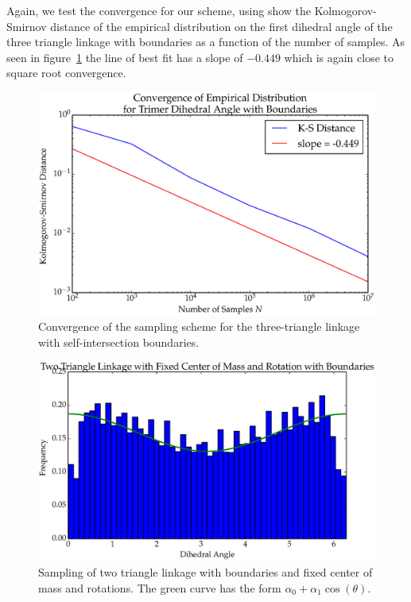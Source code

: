 Again, we test the convergence for our scheme, using show the Kolmogorov-Smirnov distance of the empirical distribution on the first dihedral angle of the three triangle linkage with boundaries as a function of the number of samples. As seen in figure~\ref{fig:KSD2} the line of best fit has a slope of $-0.449$ which is again close to square root convergence.
\begin{figure}[ht]
\centering
  \includegraphics[scale=0.6]{images/KSD2.eps}
\caption{Convergence of the sampling scheme for the three-triangle linkage with self-intersection boundaries.}
\label{fig:KSD2}
\end{figure}





\begin{figure}[ht]
\centering
  \includegraphics[scale=0.6]{images/T2_6.eps}
\caption{Sampling of two triangle linkage with boundaries and fixed center of mass and rotations. The green curve has the form $\alpha_0 + \alpha_1\cos(\theta)$.}
\label{fig:T2_6}
\end{figure}

